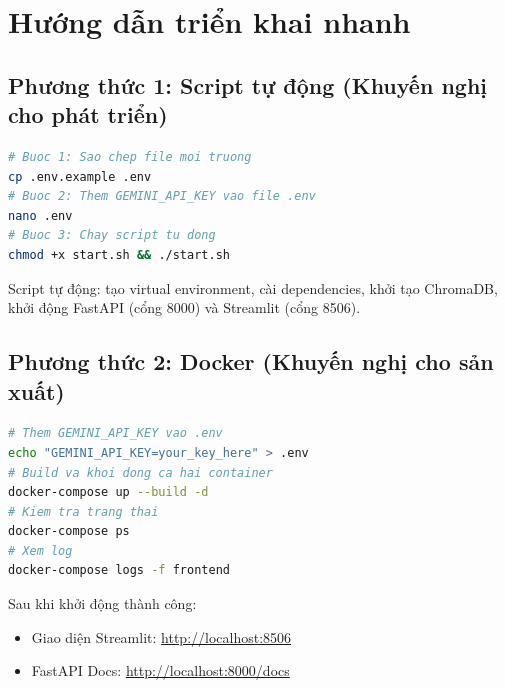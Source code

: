 \documentclass{uetgraduation}
\begin{document}
\chapter{Hướng dẫn triển khai nhanh}

\section{Phương thức 1: Script tự động (Khuyến nghị cho phát triển)}
\begin{lstlisting}[language=bash, numbers=none, caption={Khởi động 1-click với start.sh}]
# Buoc 1: Sao chep file moi truong
cp .env.example .env
# Buoc 2: Them GEMINI_API_KEY vao file .env
nano .env
# Buoc 3: Chay script tu dong
chmod +x start.sh && ./start.sh
\end{lstlisting}

\noindent Script tự động: tạo virtual environment, cài dependencies, khởi tạo ChromaDB, khởi động FastAPI (cổng 8000) và Streamlit (cổng 8506).

\section{Phương thức 2: Docker (Khuyến nghị cho sản xuất)}
\begin{lstlisting}[language=bash, numbers=none, caption={Triển khai với Docker Compose}]
# Them GEMINI_API_KEY vao .env
echo "GEMINI_API_KEY=your_key_here" > .env
# Build va khoi dong ca hai container
docker-compose up --build -d
# Kiem tra trang thai
docker-compose ps
# Xem log
docker-compose logs -f frontend
\end{lstlisting}

\noindent Sau khi khởi động thành công:
\begin{itemize}
    \item Giao diện Streamlit: \url{http://localhost:8506}
    \item FastAPI Docs: \url{http://localhost:8000/docs}
\end{itemize}
\end{document}
